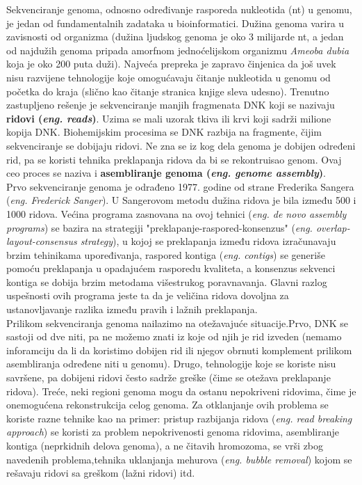 \documentclass[a4paper]{article}
\begin{document}
{Sekvenciranje genoma, odnosno određivanje rasporeda nukleotida (nt) u genomu, je jedan od fundamentalnih zadataka u bioinformatici. Dužina genoma varira u zavisnosti od organizma (dužina ljudskog genoma je oko 3 milijarde nt, a jedan od najdužih genoma pripada amorfnom jednoćelijskom organizmu \textit{Ameoba dubia} koja je oko 200 puta duži). Najveća prepreka je zapravo činjenica da još uvek nisu razvijene tehnologije koje omogućavaju čitanje nukleotida u genomu od početka do kraja (slično kao čitanje stranica knjige sleva udesno). Trenutno zastupljeno rešenje je sekvenciranje manjih fragmenata DNK koji se nazivaju \textbf{ridovi (\textit{eng. reads})}. Uzima se mali uzorak tkiva ili krvi koji sadrži milione kopija DNK. Biohemijskim procesima se DNK razbija na fragmente, čijim sekvenciranje se dobijaju ridovi. Ne zna se iz kog dela genoma je dobijen određeni rid, pa se koristi tehnika preklapanja ridova da bi se rekontruisao genom. Ovaj ceo proces se naziva i \textbf{asembliranje genoma (\textit{eng. genome assembly})}. \\
\indent Prvo sekvenciranje genoma je odrađeno 1977. godine od strane Frederika Sangera (\textit{eng. Frederick Sanger}). U Sangerovom metodu dužina ridova je bila između 500 i 1000 ridova. Većina programa zasnovana na ovoj tehnici (\textit{eng. de novo assembly programs}) se bazira na strategiji  "preklapanje-raspored-konsenzus" (\textit{eng. overlap-layout-consensus strategy}), u kojoj se preklapanja između ridova izračunavaju brzim tehinikama upore\-đivanja, raspored kontiga (\textit{eng. contigs}) se generiše pomoću preklapanja u opadajućem rasporedu kvaliteta, a konsenzus sekvenci kontiga se dobija brzim metodama višestrukog poravnavanja. Glavni razlog uspešnosti ovih programa jeste ta da je veličina ridova dovoljna za ustanovljavanje razlika između pravih i lažnih preklapanja. \\
\indent Prilikom sekvenciranja genoma nailazimo na otežavajuće situacije.Prvo, DNK se sastoji od dve niti, pa ne možemo znati iz koje od njih je rid izveden (nemamo inforamciju da li da koristimo dobijen rid ili njegov obrnuti komplement prilikom asembliranja određene niti u genomu). Drugo, tehnologije koje se koriste nisu savršene, pa dobijeni ridovi često sadrže greške (čime se otežava preklapanje ridova). Treće, neki regioni genoma mogu da ostanu nepokriveni ridovima, čime je onemogućena rekonstrukcija celog genoma. Za otklanjanje ovih problema se koriste razne tehnike kao na primer: pristup razbijanja ridova (\textit{eng. read breaking 
approach}) se koristi za problem nepokrivenosti genoma ridovima, asembliranje kontiga (neprkidnih delova genoma), a ne čitavih hromozoma, se vrši zbog navedenih problema,tehnika uklanjanja mehurova (\textit{eng. bubble removal}) kojom se rešavaju ridovi sa greškom (lažni ridovi) itd. \\
}
\end{document}
